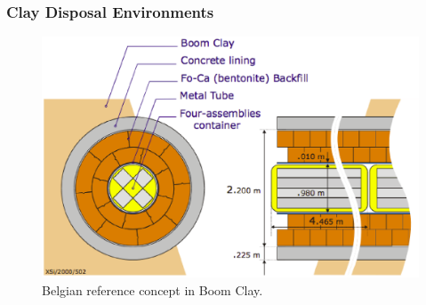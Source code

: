 

\begin{frame}[ctb!]
  \frametitle{Clay Disposal Environments}

  \begin{figure}[h!]
    \begin{center}
      \includegraphics[height=.7\textheight]{belgianClayRedImp.eps}
    \end{center}
    \caption{Belgian reference concept in Boom Clay.\cite{von_lensa_red-impact_2005}}
    \label{fig:belgianClayRedImp}
  \end{figure}

\end{frame}

